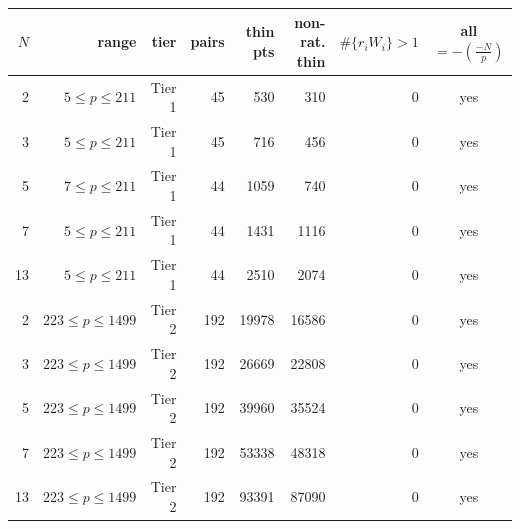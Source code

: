\begin{tabular}{rrrrrrrc}
\toprule
$N$ & range & tier & pairs & thin pts & non-rat. thin & $\#\{r_iW_i\}>1$ & all $=-\left(\frac{-N}{p}\right)$\\
\midrule
2 & $5\le p\le 211$ & Tier 1 & 45 & 530 & 310 & 0 & yes\\
3 & $5\le p\le 211$ & Tier 1 & 45 & 716 & 456 & 0 & yes\\
5 & $7\le p\le 211$ & Tier 1 & 44 & 1059 & 740 & 0 & yes\\
7 & $5\le p\le 211$ & Tier 1 & 44 & 1431 & 1116 & 0 & yes\\
13 & $5\le p\le 211$ & Tier 1 & 44 & 2510 & 2074 & 0 & yes\\
2 & $223\le p\le 1499$ & Tier 2 & 192 & 19978 & 16586 & 0 & yes\\
3 & $223\le p\le 1499$ & Tier 2 & 192 & 26669 & 22808 & 0 & yes\\
5 & $223\le p\le 1499$ & Tier 2 & 192 & 39960 & 35524 & 0 & yes\\
7 & $223\le p\le 1499$ & Tier 2 & 192 & 53338 & 48318 & 0 & yes\\
13 & $223\le p\le 1499$ & Tier 2 & 192 & 93391 & 87090 & 0 & yes\\
\bottomrule
\end{tabular}
